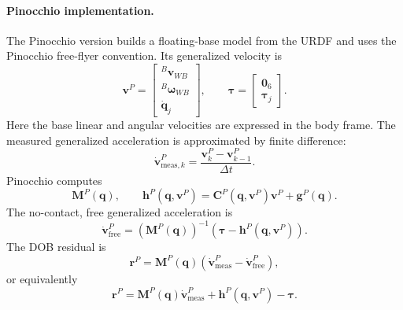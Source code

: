 \documentclass[11pt, a4paper]{article}
\begin{document}
\paragraph{Pinocchio implementation.}
The Pinocchio version builds a floating-base model from the URDF and uses the
Pinocchio free-flyer convention. Its generalized velocity is
\begin{equation}
    \bm{v}^{P}
    =
    \begin{bmatrix}
        {}^{B}\bm{v}_{WB} \\
        {}^{B}\bm{\omega}_{WB} \\
        \dot{\bm{q}}_j
    \end{bmatrix},
    \qquad
    \bm{\tau}
    =
    \begin{bmatrix}
        \bm{0}_{6} \\
        \bm{\tau}_j
    \end{bmatrix}.
\end{equation}
Here the base linear and angular velocities are expressed in the body frame.
The measured generalized acceleration is approximated by finite difference:
\begin{equation}
    \dot{\bm{v}}^{P}_{\mathrm{meas},k}
    =
    \frac{\bm{v}^{P}_{k}-\bm{v}^{P}_{k-1}}{\Delta t}.
\end{equation}
Pinocchio computes
\begin{equation}
    \bm{M}^{P}(\bm{q}),
    \qquad
    \bm{h}^{P}(\bm{q},\bm{v}^{P})
    =
    \bm{C}^{P}(\bm{q},\bm{v}^{P})\bm{v}^{P}
    +
    \bm{g}^{P}(\bm{q}).
\end{equation}
The no-contact, free generalized acceleration is
\begin{equation}
    \dot{\bm{v}}^{P}_{\mathrm{free}}
    =
    \left(\bm{M}^{P}(\bm{q})\right)^{-1}
    \left(
        \bm{\tau}
        -
        \bm{h}^{P}(\bm{q},\bm{v}^{P})
    \right).
\end{equation}
The DOB residual is
\begin{equation}
    \bm{r}^{P}
    =
    \bm{M}^{P}(\bm{q})
    \left(
        \dot{\bm{v}}^{P}_{\mathrm{meas}}
        -
        \dot{\bm{v}}^{P}_{\mathrm{free}}
    \right),
\end{equation}
or equivalently
\begin{equation}
    \bm{r}^{P}
    =
    \bm{M}^{P}(\bm{q})\dot{\bm{v}}^{P}_{\mathrm{meas}}
    +
    \bm{h}^{P}(\bm{q},\bm{v}^{P})
    -
    \bm{\tau}.
\end{equation}
\end{document}
